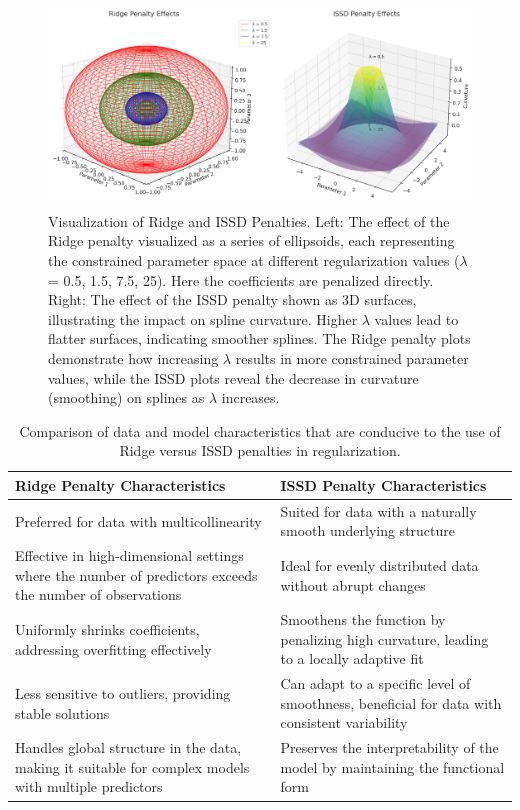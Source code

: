 \documentclass[12pt, twoside,hidelinks]{article}
\theoremstyle{definition}
\numberwithin{equation}{section}
\begin{document}
\begin{figure}[H]
    \centering
    \includegraphics[width=\textwidth]{visuals/ridge_vs_issd_plot_nice.png}
    \caption{Visualization of Ridge and ISSD Penalties. Left: The effect of the Ridge penalty visualized as a series of ellipsoids, each representing the constrained parameter space at different regularization values ($\lambda$ = 0.5, 1.5, 7.5, 25). Here the coefficients are penalized directly. Right: The effect of the ISSD penalty shown as 3D surfaces, illustrating the impact on spline curvature. Higher $\lambda$ values lead to flatter surfaces, indicating smoother splines. The Ridge penalty plots demonstrate how increasing $\lambda$ results in more constrained parameter values, while the ISSD plots reveal the decrease in curvature (smoothing) on splines as $\lambda$ increases.}
    \label{fig:ridge_vs_issd}
\end{figure}

\begin{table}[H]
\centering
\begin{tabular}{p{}p{}}
\hline
\textbf{Ridge Penalty Characteristics} & \textbf{ISSD Penalty Characteristics} \\
\hline
Preferred for data with multicollinearity & Suited for data with a naturally smooth underlying structure \\
Effective in high-dimensional settings where the number of predictors exceeds the number of observations & Ideal for evenly distributed data without abrupt changes \\
Uniformly shrinks coefficients, addressing overfitting effectively & Smoothens the function by penalizing high curvature, leading to a locally adaptive fit \\
Less sensitive to outliers, providing stable solutions & Can adapt to a specific level of smoothness, beneficial for data with consistent variability \\
Handles global structure in the data, making it suitable for complex models with multiple predictors & Preserves the interpretability of the model by maintaining the functional form \\
\hline
\end{tabular}
\caption{Comparison of data and model characteristics that are conducive to the use of Ridge versus ISSD penalties in regularization.}
\label{table:ridge_vs_issd}
\end{table}
\end{document}
